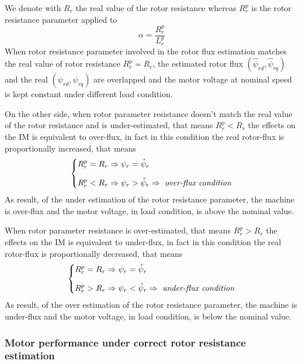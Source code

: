 \documentclass[12pt,a4paper]{scrartcl}
\begin{document}
\begin{onehalfspace}
We denote with $R_r$ the real value of the rotor resistance whereas $R_r^p$ is the rotor resistance parameter applied to 
\begin{equation}\label{eq64}
	\alpha = \frac{R_r^p}{L_r^p}
\end{equation}
When rotor resistance parameter involved in the rotor flux estimation matches the real value of rotor resistance $R_r^p = R_r$, the estimated rotor flux $(\hat{\psi}_{rd}, \hat{\psi}_{rq})$ and the real $({\psi}_{rd}, {\psi}_{rq})$ are overlapped and the motor voltage at nominal speed is kept constant under different load condition. 

On the other side, when rotor parameter resistance doesn't match the real value of the rotor resistance and is under-estimated, that means $R_r^p < R_r$ the effects on the IM is equivalent to over-flux, in fact in this condition the real rotor-flux is proportionally increased, that means 
\begin{equation}\label{eq65}
	\left\{
	\begin{split} 
		R_r^p & = R_r  \Rightarrow \psi_r = \hat{\psi}_{r}  \\[6pt]
		R_r^p & < R_r  \Rightarrow \psi_r > \hat{\psi}_{r}  \Rightarrow \textrm{ \textit{over-flux condition}}
	\end{split}
	\right.
\end{equation}
As result, of the under estimation of the rotor resistance parameter, the machine is over-flux and the motor voltage, in load condition, is above the nominal value.

When rotor parameter resistance is over-estimated, that means $R_r^p > R_r$ the effects on the IM is equivalent to under-flux, in fact in this condition the real rotor-flux is proportionally decreased, that means 
\begin{equation}\label{eq66}
	\left\{
	\begin{split} 
		R_r^p & = R_r  \Rightarrow \psi_r = \hat{\psi}_{r}  \\[6pt]
		R_r^p & > R_r  \Rightarrow \psi_r < \hat{\psi}_{r}  \Rightarrow \textrm{ \textit{under-flux condition}}
	\end{split}
	\right.
\end{equation}
As result, of the over estimation of the rotor resistance parameter, the machine is under-flux and the motor voltage, in load condition, is below the nominal value.

\subsubsection{Motor performance under correct rotor resistance estimation}


\end{onehalfspace}
\end{document}
